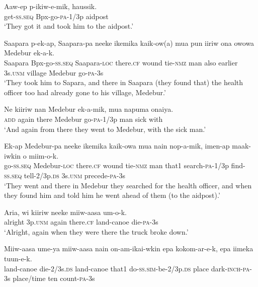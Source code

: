 \ea
\gll  Aaw-ep  p-ikiw-e-mik,  haussik. \\
get-\textsc{ss.seq}  Bpx-go-\textsc{pa}-1/3p  aidpost \\
\glt ‘They got it and took him to the aidpost.’ \\
\z


\ea
\gll  Saapara  p-ek-ap,  Saapara-pa  neeke  ikemika  kaik-ow(a) mua  pun  iiriw  ona  owowa  Medebur  ek-a-k. \\
Saapara  Bpx-go-\textsc{ss.seq}  Saapara-\textsc{loc}  there.\textsc{cf}  wound  tie-\textsc{nmz}   man  also  earlier  3s.\textsc{unm}  village  Medebur  go-\textsc{pa}-3s \\


\glt ‘They took him to Sapara, and there in Saapara (they found that) the health officer too had already gone to his village, Medebur.’ \\
\z


\ea
\gll  Ne  kiiriw  nan  Medebur  ek-a-mik,  mua  napuma  onaiya. \\
\textsc{add}  again  there  Medebur  go-\textsc{pa}-1/3p  man  sick  with \\
\glt ‘And again from there they went to Medebur, with the sick man.’ \\
\z


\ea
\gll  Ek-ap  Medebur-pa  neeke  ikemika  kaik-owa  mua  nain  nop-a-mik,  imen-ap  maak-iwkin  o  miim-o-k. \\
go-\textsc{ss.seq}  Medebur-\textsc{loc}  there.\textsc{cf}  wound  tie-\textsc{nmz}  man  that1  search-\textsc{pa}-1/3p  find-\textsc{ss.seq}  tell-2/3p.\textsc{ds}  3s.\textsc{unm}  precede-\textsc{pa}-3s \\


\glt ‘They went and there in Medebur they searched for the health officer, and when they found him and told him he went ahead of them (to the aidpost).’ \\
\z


\ea
\gll  Aria,  wi  kiiriw  neeke  miiw-aasa  um-o-k. \\
alright  3p.\textsc{unm}  again  there.\textsc{cf}  land-canoe  die-\textsc{pa}-3s \\
\glt ‘Alright, again when they were there the truck broke down.’ \\
\z


\ea
\gll  Miiw-aasa  ume-ya  miiw-aasa  nain  on-am-ikai-wkin         epa  kokom-ar-e-k,  epa  iimeka  tuun-e-k. \\
land-canoe  die-2/3s.\textsc{ds}  land-canoe  that1  do-\textsc{ss}.\textsc{sim}-be-2/3p.\textsc{ds}  place  dark-\textsc{inch}-\textsc{pa}-3s  place/time  ten  count-\textsc{pa}-3s \\


